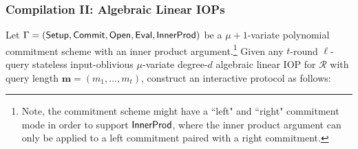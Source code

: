 \subsubsection*{Compilation II: Algebraic Linear IOPs} 

Let $\Gamma = (\textsf{{Setup}}, \textsf{{Commit}}, \textsf{{Open}}, \textsf{{Eval}}, \textsf{{InnerProd}})$ be a $\mu+1$-variate polynomial commitment scheme with an inner product argument.\footnote{Note, the commitment scheme might have a ``left" and ``right" commitment mode in order to support $\textsf{{InnerProd}}$, where the inner product argument can only be applied to a left commitment paired with a right commitment.} Given any $t$-round $\ell$-query stateless input-oblivious $\mu$-variate degree-$d$ algebraic linear IOP for $\mathcal{R}$ with query length $\mathbf{m} = (m_1,...,m_t)$, construct an interactive protocol as follows: 

